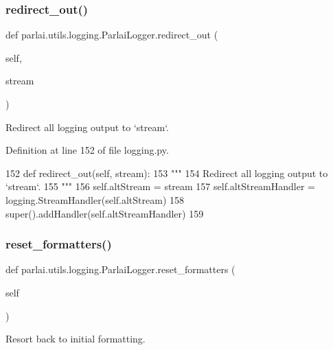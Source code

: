 \subsubsection{\texorpdfstring{redirect\+\_\+out()}{redirect\_out()}}
{\footnotesize\ttfamily def parlai.\+utils.\+logging.\+Parlai\+Logger.\+redirect\+\_\+out (\begin{DoxyParamCaption}\item[{}]{self,  }\item[{}]{stream }\end{DoxyParamCaption})}

\begin{DoxyVerb}Redirect all logging output to `stream`.
\end{DoxyVerb}
 

Definition at line 152 of file logging.\+py.


\begin{DoxyCode}
152     \textcolor{keyword}{def }redirect\_out(self, stream):
153         \textcolor{stringliteral}{"""}
154 \textcolor{stringliteral}{        Redirect all logging output to `stream`.}
155 \textcolor{stringliteral}{        """}
156         self.altStream = stream
157         self.altStreamHandler = logging.StreamHandler(self.altStream)
158         super().addHandler(self.altStreamHandler)
159 
\end{DoxyCode}
\mbox{\label{classparlai_1_1utils_1_1logging_1_1ParlaiLogger_a48e352dd5d21a2bb0637653b9bc7b354}} 
\subsubsection{\texorpdfstring{reset\+\_\+formatters()}{reset\_formatters()}}
{\footnotesize\ttfamily def parlai.\+utils.\+logging.\+Parlai\+Logger.\+reset\+\_\+formatters (\begin{DoxyParamCaption}\item[{}]{self }\end{DoxyParamCaption})}

\begin{DoxyVerb}Resort back to initial formatting.
\end{DoxyVerb}
 

